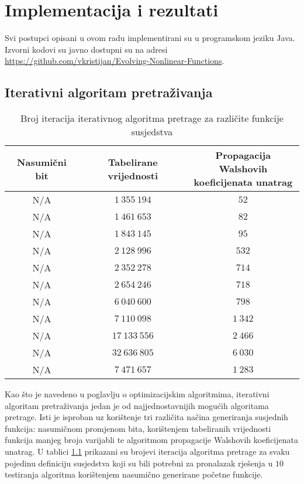 \chapter{Implementacija i rezultati}

Svi postupci opisani u ovom radu implementirani su u programskom jeziku Java.
Izvorni kodovi su javno dostupni su na adresi \href{https://github.com/vkristijan/Evolving-Nonlinear-Functions}{https://github.com/vkristijan/Evolving-Nonlinear-Functions}.

\section{Iterativni algoritam pretraživanja}
\begin{table}[]
    \centering
    \captionsetup{justification=centering}
    \caption{Broj iteracija iterativnog algoritma pretrage za različite funkcije susjedstva}
    \begin{tabular}{ccc} \hline
        Nasumični bit & Tabelirane vrijednosti & \makecell{Propagacija Walshovih \\ koeficijenata unatrag} \\ \hline
        N/A &  $1\:355\:194$ &     $52$ \\
        N/A &  $1\:461\:653$ &     $82$ \\
        N/A &  $1\:843\:145$ &     $95$ \\
        N/A &  $2\:128\:996$ &    $532$ \\
        N/A &  $2\:352\:278$ &    $714$ \\
        N/A &  $2\:654\:246$ &    $718$ \\
        N/A &  $6\:040\:600$ &    $798$ \\
        N/A &  $7\:110\:098$ & $1\:342$ \\
        N/A & $17\:133\:556$ & $2\:466$ \\
        N/A & $32\:636\:805$ & $6\:030$ \\ \hline
        N/A &  $7\:471\:657$ & $1\:283$
    \end{tabular}
    \label{tbl:iterative_6}
\end{table}

Kao što je navedeno u poglavlju o optimizacijskim algoritmima, iterativni algoritam pretraživanja jedan je od najjednostavnijih mogućih algoritama pretrage. 
Isti je isproban uz korištenje tri različita načina generiranja susjednih funkcija: nasumičnom promjenom bita, korištenjem tabeliranih vrijednosti funkcija manjeg broja varijabli te algoritmom propagacije Walshovih koeficijenata unatrag.
U tablici \ref{tbl:iterative_6} prikazani su brojevi iteracija algoritma pretrage za svaku pojedinu definiciju susjedstva koji su bili potrebni za pronalazak rješenja u $10$ testiranja algoritma korištenjem nasumično generirane početne funkcije.

